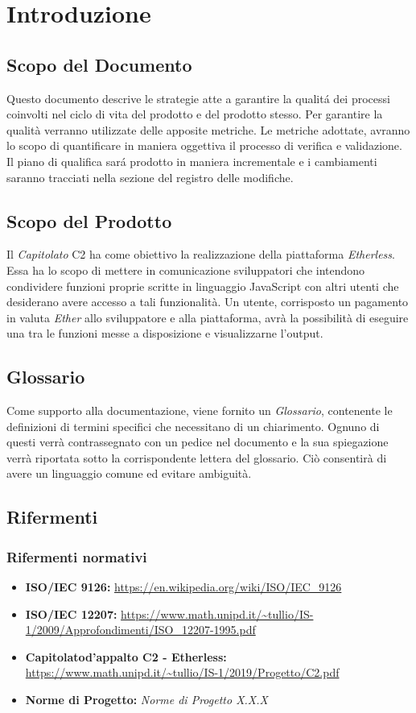 \section{Introduzione}

\subsection{Scopo del Documento}
Questo documento descrive le strategie atte a garantire la qualit\'a dei processi coinvolti nel ciclo di vita del prodotto e del prodotto stesso. Per garantire la qualità verranno utilizzate delle apposite metriche. Le metriche adottate, avranno lo scopo di quantificare in maniera oggettiva il processo di verifica e validazione. Il piano di qualifica sar\'a prodotto in maniera incrementale e i cambiamenti saranno tracciati nella sezione del registro delle modifiche.


\subsection{Scopo del Prodotto}
Il \textit{Capitolato\glo} C2 ha come obiettivo la realizzazione della piattaforma \textit{Etherless}. Essa ha lo scopo di mettere in comunicazione sviluppatori che intendono condividere funzioni proprie scritte in linguaggio JavaScript con altri utenti che desiderano avere accesso a tali funzionalità. Un utente, corrisposto un pagamento in valuta \textit{Ether\glos} allo sviluppatore e alla piattaforma, avrà la possibilità di eseguire una tra le funzioni messe a disposizione e visualizzarne l'output. 

\subsection{Glossario}
Come supporto alla documentazione, viene fornito un \textit{Glossario}\docs,
contenente le definizioni di termini specifici che necessitano di un chiarimento.
Ognuno di questi verr\`a contrassegnato con un pedice \glo nel documento e la sua
spiegazione verr\`a riportata sotto la corrispondente lettera del glossario. Ci\`o
consentir\`a di avere un linguaggio comune ed evitare ambiguit\`a.

\subsection{Rifermenti}
\subsubsection{Rifermenti normativi}
\begin{itemize}
\item \textbf{ISO/IEC 9126:} \url{https://en.wikipedia.org/wiki/ISO/IEC_9126}
\item \textbf{ISO/IEC 12207:} \url{https://www.math.unipd.it/~tullio/IS-1/2009/Approfondimenti/ISO_12207-1995.pdf}
\item \textbf{Capitolato\glo d'appalto C2 - Etherless:} \url{https://www.math.unipd.it/~tullio/IS-1/2019/Progetto/C2.pdf}
\item \textbf{Norme di Progetto:} \textit{Norme di Progetto X.X.X}
\end{itemize}
